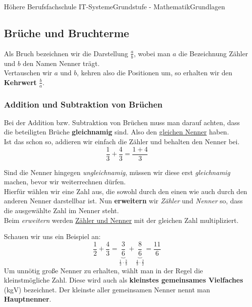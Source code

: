 \documentclass[11pt,twocolumn,oneside,openany,headings=optiontotoc,11pt,numbers=noenddot]{article}
\begin{document}
\begin{worksheet}{Höhere Berufsfachschule IT-Systeme}{Grundstufe - Mathematik}{Grundlagen}
		\subsection{Brüche und Bruchterme}
		Als Bruch bezeichnen wir die Darstellung \(\frac{a}{b}\), wobei man \(a\) die Bezeichnung Zähler und \(b\) den Namen Nenner trägt.\\
		Vertauschen wir \(a\) und \(b\), kehren also die Positionen um, so erhalten wir den \textbf{Kehrwert} \(\frac{b}{a}\).\\
		\subsubsection*{Addition und Subtraktion von Brüchen}
		Bei der Addition bzw. Subtraktion von Brüchen muss man darauf achten, dass die beteiligten Brüche \textbf{gleichnamig} sind. Also den \underline{gleichen Nenner} haben.\\
		Ist das schon so, addieren wir einfach die Zähler und behalten den Nenner bei. \[\frac{1}{3} + \frac{4}{3} = \frac{1+4}{3}\]
		\par\noindent
		Sind die Nenner hingegen \textit{ungleichnamig}, müssen wir diese erst \textit{gleichnamig} machen, bevor wir weiterrechnen dürfen.\\
		Hierfür wählen wir eine Zahl aus, die sowohl durch den einen wie auch durch den anderen Nenner darstellbar ist. Nun \textbf{erweitern} wir \textit{Zähler} und \textit{Nenner} so, dass die ausgewählte Zahl im Nenner steht.\\
		Beim \textit{erweitern} werden \underline{Zähler und Nenner} mit der gleichen Zahl multipliziert.\\
		\par\noindent
		Schauen wir uns ein Beispiel an:
		\[\frac{1}{2} + \frac{4}{3} = \underbrace{\frac{3}{6}}_{\frac{1}{2}\cdot{}\frac{3}{3}} + \underbrace{\frac{8}{6}}_{\frac{4}{3}\cdot{}\frac{2}{2}} = \frac{11}{6}\]
		Um unnötig große Nenner zu erhalten, wählt man in der Regel die kleinstmögliche Zahl. Diese wird auch als \textbf{kleinstes gemeinsames Vielfaches} (kgV) bezeichnet. Der kleinste aller gemeinsamen Nenner nennt man \textbf{Hauptnenner}.

\end{worksheet}
\end{document}
